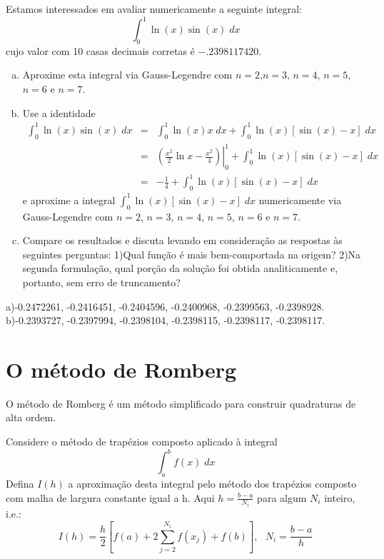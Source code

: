 \begin{exer}
Estamos interessados em avaliar numericamente a seguinte integral:
$$\int_0^1 \ln(x)\sin(x)\;dx$$
cujo valor com 10 casas decimais corretas é $-.2398117420$.
\begin{enumerate}[a)]
\item Aproxime esta integral via Gauss-Legendre com $n=2$,$n=3$, $n=4$, $n=5$, $n=6$ e $n=7$.
\item Use a identidade
\begin{eqnarray*}
\int_0^1 \ln(x)\sin(x)\;dx&=&\int_0^1 \ln(x)x\;dx+\int_0^1 \ln(x)\left[\sin(x)-x\right]\;dx\\
&=&\left.\left(\frac{x^2}{2}\ln x-\frac{x^2}{4}\right)\right|_0^1+\int_0^1 \ln(x)\left[\sin(x)-x\right]\;dx\\
&=&-\frac{1}{4}+\int_0^1 \ln(x)\left[\sin(x)-x\right]\;dx
\end{eqnarray*}
e aproxime a integral $\int_0^1 \ln(x)\left[\sin(x)-x\right]\;dx$ numericamente via Gauss-Legendre com $n=2$, $n=3$, $n=4$, $n=5$, $n=6$ e $n=7$.
\item Compare os resultados e discuta levando em consideração as respostas às seguintes perguntas: 1)Qual função é mais bem-comportada na origem? 2)Na segunda formulação, qual porção da solução foi obtida analiticamente e, portanto, sem erro de truncamento?
\end{enumerate}
\end{exer}
\begin{resp}

    a)-0.2472261,  -0.2416451,  -0.2404596,  -0.2400968,  -0.2399563,  -0.2398928.
    b)-0.2393727,  -0.2397994,  -0.2398104,  -0.2398115,  -0.2398117,  -0.2398117.

\end{resp}

\section{O método de Romberg}
O método de Romberg é um método simplificado para construir quadraturas de alta ordem.

Considere o método de trapézios composto aplicado à integral
$$\int_a^bf(x)\;dx$$
Defina $I(h)$ a aproximação desta integral pelo método dos trapézios composto com  malha de largura constante igual a h. Aqui $h=\frac{b-a}{N_i}$ para algum $N_i$ inteiro, i.e.:
$$I(h)=\frac{h}{2}\left[f(a)+2\sum_{j=2}^{N_i} f(x_j)+ f(b)\right],~~~N_i=\frac{b-a}{h}$$

